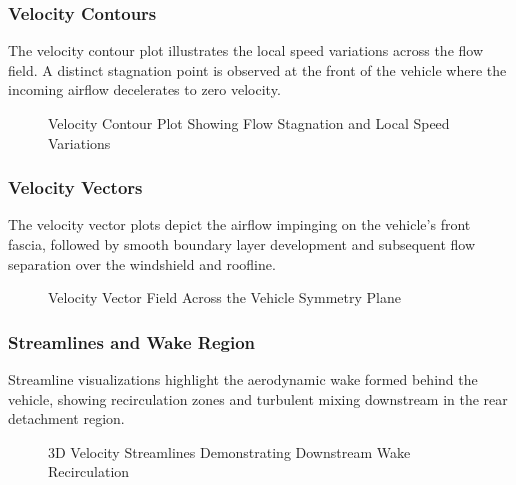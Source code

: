 \documentclass[12pt, a4paper]{article}
\begin{document}
	\subsubsection{Velocity Contours}
	The velocity contour plot illustrates the local speed variations across the flow field. A distinct stagnation point is observed at the front of the vehicle where the incoming airflow decelerates to zero velocity.
	
	\begin{figure}[H]
		\centering
		\caption{Velocity Contour Plot Showing Flow Stagnation and Local Speed Variations}
		\label{fig:velocity_contour}
	\end{figure}
	
	\subsubsection{Velocity Vectors}
	The velocity vector plots depict the airflow impinging on the vehicle's front fascia, followed by smooth boundary layer development and subsequent flow separation over the windshield and roofline.
	
	\begin{figure}[H]
		\centering
		\caption{Velocity Vector Field Across the Vehicle Symmetry Plane}
		\label{fig:velocity_vectors}
	\end{figure}
	
	\subsubsection{Streamlines and Wake Region}
	Streamline visualizations highlight the aerodynamic wake formed behind the vehicle, showing recirculation zones and turbulent mixing downstream in the rear detachment region.
	
	\begin{figure}[H]
		\centering
		\caption{3D Velocity Streamlines Demonstrating Downstream Wake Recirculation}
		\label{fig:streamlines}
	\end{figure}
	
\end{document}
